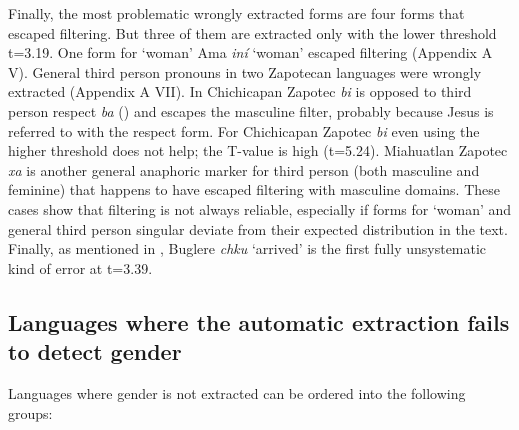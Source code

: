 \documentclass[output=collectionpaper]{langsci/langscibook}
\begin{document}
Finally, the most problematic wrongly extracted forms are four forms that escaped filtering. But three of them are extracted only with the lower threshold t=3.19. One form for ‘woman’ Ama \textit{iní} ‘woman’ escaped filtering (Appendix A V). General third person pronouns in two Zapotecan languages were wrongly extracted (Appendix A VII). In Chichicapan Zapotec \textit{bi} is opposed to third person respect \textit{ba} (\citealt{Benton1975}) and escapes the masculine filter, probably because Jesus is referred to with the respect form. For Chichicapan Zapotec \textit{bi} even using the higher threshold does not help; the T-value is high (t=5.24). Miahuatlan Zapotec \textit{xa\textquotesingle} is another general anaphoric marker for third person (both masculine and feminine) that happens to have escaped filtering with masculine domains. These cases show that filtering is not always reliable, especially if forms for ‘woman’ and general third person singular deviate from their expected distribution in the text. Finally, as mentioned in , Buglere \textit{chku} ‘arrived’ is the first fully unsystematic kind of error at t=3.39.

\subsection{Languages where the automatic extraction fails to detect gender}
\label{sec:BW:3.5}

Languages where gender is not extracted can be ordered into the following groups:
\end{document}

